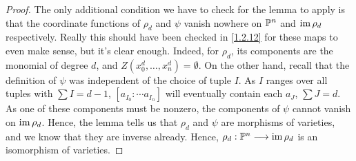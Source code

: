 \begin{proof}
    The only additional condition we have to check for the lemma to apply is that the coordinate functions of $\rho_d$ and $\psi$ vanish nowhere on $\P^n$ and $\im \rho_d$ respectively. Really this should have been checked in \ref{1.2.12} for these maps to even make sense, but it's clear enough. Indeed, for $\rho_d$, its components are the monomial of degree $d$, and $Z(x_0^d, \dots, x_n^d) = \emptyset$. On the other hand, recall that the definition of $\psi$ was independent of the choice of tuple $I$. As $I$ ranges over all tuples with $\sum I = d - 1$, $[a_{I_0} : \cdots a_{I_n}]$ will eventually contain each $a_J$, $\sum J = d$. As one of these components must be nonzero, the components of $\psi$ cannot vanish on $\im \rho_d$. Hence, the lemma tells us that $\rho_d$ and $\psi$ are morphisms of varieties, and we know that they are inverse already. Hence, $\rho_d: \P^n \longrightarrow \im \rho_d$ is an isomorphism of varieties.
\end{proof}
